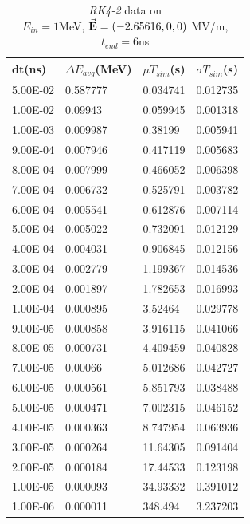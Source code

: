 \documentclass[a4paper,oneside,12pt]{report}
\numberwithin{equation}{chapter}
\begin{document}
\begin{table}[H]
    \centering
    \begin{tabular}{|l|l|l|l|}
    \hline
    dt(ns)       & $\Delta E_{avg}$(MeV) & $\mu T_{sim}$(s)    & $\sigma T_{sim}$(s) \\\hline
        5.00E-02 & 0.587777     & 0.034741 & 0.012735 \\\hline
        1.00E-02 & 0.09943      & 0.059945 & 0.001318 \\\hline
        1.00E-03 & 0.009987     & 0.38199  & 0.005941 \\\hline
        9.00E-04 & 0.007946     & 0.417119 & 0.005683 \\\hline
        8.00E-04 & 0.007999     & 0.466052 & 0.006398 \\\hline
        7.00E-04 & 0.006732     & 0.525791 & 0.003782 \\\hline
        6.00E-04 & 0.005541     & 0.612876 & 0.007114 \\\hline
        5.00E-04 & 0.005022     & 0.732091 & 0.012129 \\\hline
        4.00E-04 & 0.004031     & 0.906845 & 0.012156 \\\hline
        3.00E-04 & 0.002779     & 1.199367 & 0.014536 \\\hline
        2.00E-04 & 0.001897     & 1.782653 & 0.016993 \\\hline
        1.00E-04 & 0.000895     & 3.52464  & 0.029778 \\\hline
        9.00E-05 & 0.000858     & 3.916115 & 0.041066 \\\hline
        8.00E-05 & 0.000731     & 4.409459 & 0.040828 \\\hline
        7.00E-05 & 0.00066      & 5.012686 & 0.042727 \\\hline
        6.00E-05 & 0.000561     & 5.851793 & 0.038488 \\\hline
        5.00E-05 & 0.000471     & 7.002315 & 0.046152 \\\hline
        4.00E-05 & 0.000363     & 8.747954 & 0.063936 \\\hline
        3.00E-05 & 0.000264     & 11.64305 & 0.091404 \\\hline
        2.00E-05 & 0.000184     & 17.44533 & 0.123198 \\\hline
        1.00E-05 & 0.000093     & 34.93332 & 0.391012 \\\hline
        1.00E-06 & 0.000011     & 348.494  & 3.237203 \\\hline
    \end{tabular}
    \caption{\textit{RK4-2} data on \\$E_{in}=1$MeV, $\vec{\textbf{E}}=(-2.65616, 0, 0)$ MV/m, $t_{end}=6$ns}
    \label{tab:rk2_statE90_table}
\end{table}
\end{document}

